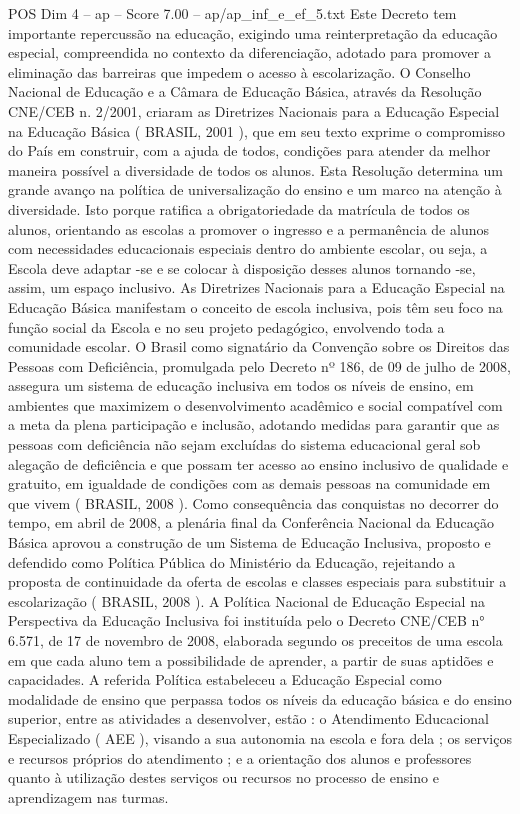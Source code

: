 \begin{textsample}{POS Dim 4 – ap – Score 7.00 – ap/ap\_inf\_e\_ef\_5.txt}
Este Decreto tem importante repercussão na educação, exigindo uma reinterpretação da educação especial, compreendida no contexto da diferenciação, adotado para promover a eliminação das barreiras que impedem o acesso à escolarização.
O Conselho Nacional de Educação e a Câmara de Educação Básica, através da Resolução CNE/CEB n. 2/2001, criaram as Diretrizes Nacionais para a Educação Especial na Educação Básica ( BRASIL, 2001 ), que em seu texto exprime o compromisso do País em construir, com a ajuda de todos, condições para atender da melhor maneira possível a diversidade de todos os alunos.
Esta Resolução determina um grande avanço na política de universalização do ensino e um marco na atenção à diversidade.
Isto porque ratifica a obrigatoriedade da matrícula de todos os alunos, orientando as escolas a promover o ingresso e a permanência de alunos com necessidades educacionais especiais dentro do ambiente escolar, ou seja, a Escola deve adaptar -se e se colocar à disposição desses alunos tornando -se, assim, um espaço inclusivo.
As Diretrizes Nacionais para a Educação Especial na Educação Básica manifestam o conceito de escola inclusiva, pois têm seu foco na função social da Escola e no seu projeto pedagógico, envolvendo toda a comunidade escolar.
O Brasil como signatário da Convenção sobre os Direitos das Pessoas com Deficiência, promulgada pelo Decreto nº 186, de 09 de julho de 2008, assegura um sistema de educação inclusiva em todos os níveis de ensino, em ambientes que maximizem o desenvolvimento acadêmico e social compatível com a meta da plena participação e inclusão, adotando medidas para garantir que as pessoas com deficiência não sejam excluídas do sistema educacional geral sob alegação de deficiência e que possam ter acesso ao ensino inclusivo de qualidade e gratuito, em igualdade de condições com as demais pessoas na comunidade em que vivem ( BRASIL, 2008 ).
Como consequência das conquistas no decorrer do tempo, em abril de 2008, a plenária final da Conferência Nacional da Educação Básica aprovou a construção de um Sistema de Educação Inclusiva, proposto e defendido como Política Pública do Ministério da Educação, rejeitando a proposta de continuidade da oferta de escolas e classes especiais para substituir a escolarização ( BRASIL, 2008 ).
A Política Nacional de Educação Especial na Perspectiva da Educação Inclusiva foi instituída pelo o Decreto CNE/CEB n{\EmojiFont °} 6.571, de 17 de novembro de 2008, elaborada segundo os preceitos de uma escola em que cada aluno tem a possibilidade de aprender, a partir de suas aptidões e capacidades.
A referida Política estabeleceu a Educação Especial como modalidade de ensino que perpassa todos os níveis da educação básica e do ensino superior, entre as atividades a desenvolver, estão : o Atendimento Educacional Especializado ( AEE ), visando a sua autonomia na escola e fora dela ; os serviços e recursos próprios do atendimento ; e a orientação dos alunos e professores quanto à utilização destes serviços ou recursos no processo de ensino e aprendizagem nas turmas.

\end{textsample}
